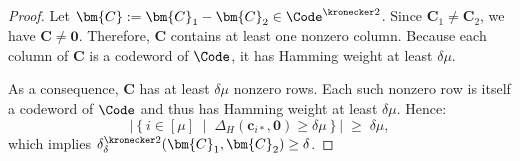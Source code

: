 


\subsection{\methodname}
\label{sec:dualswitch}


\begin{proof}
Let $\bm{C}:=\bm{C}_1-\bm{C}_2\in\Code^{\kronecker 2}$.
Since $\bm{C}_1\neq\bm{C}_2$, we have $\bm{C}\neq\bm{0}$.
Therefore, $\bm{C}$ contains at least one nonzero column.
Because each column of $\bm{C}$ is a codeword of $\Code$,
it has Hamming weight at least $\delta\mu$.

As a consequence, $\bm{C}$ has at least $\delta\mu$ nonzero rows.
Each such nonzero row is itself a codeword of $\Code$
and thus has Hamming weight at least $\delta\mu$.
Hence:
\[
\left|
\left\{
i\in[\mu]
\;\middle|\;
\Delta_H(\bm{c}_{i*},\bm{0}) \ge \delta\mu
\right\}
\right|
\;\ge\;
\delta\mu,
\]
which implies
$\delta^{\kronecker 2}_{\delta}(\bm{C}_1,\bm{C}_2)\ge\delta$.
\end{proof}




